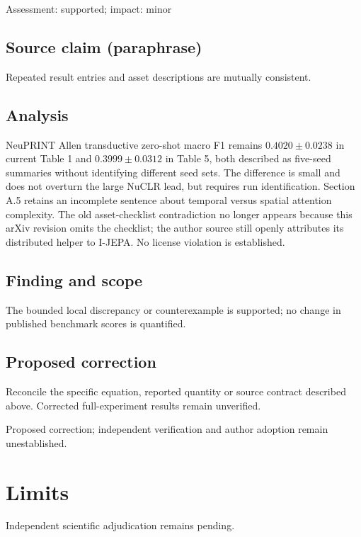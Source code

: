 \documentclass[11pt]{article}
\begin{document}
Assessment: supported; impact: minor

\subsection*{Source claim (paraphrase)}

Repeated result entries and asset descriptions are mutually consistent.

\subsection*{Analysis}

NeuPRINT Allen transductive zero-shot macro F1 remains \(0.4020\pm0.0238\) in current Table 1 and \(0.3999\pm0.0312\) in Table 5, both described as five-seed summaries without identifying different seed sets. The difference is small and does not overturn the large NuCLR lead, but requires run identification. Section A.5 retains an incomplete sentence about temporal versus spatial attention complexity. The old asset-checklist contradiction no longer appears because this arXiv revision omits the checklist; the author source still openly attributes its distributed helper to I-JEPA. No license violation is established.

\subsection*{Finding and scope}

The bounded local discrepancy or counterexample is supported; no change in published benchmark scores is quantified.

\subsection*{Proposed correction}

Reconcile the specific equation, reported quantity or source contract described above. Corrected full-experiment results remain unverified.

Proposed correction; independent verification and author adoption remain unestablished.

\section*{Limits}

Independent scientific adjudication remains pending.\par
\end{document}
